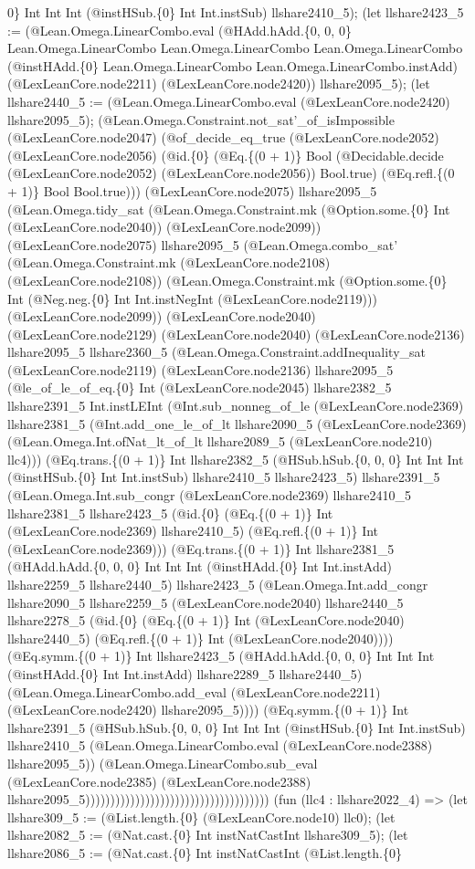\documentclass[11pt]{article}
\begin{document}
0\} Int Int Int (@instHSub.\{0\} Int Int.instSub) llshare2410\_5); (let llshare2423\_5 := (@Lean.Omega.LinearCombo.eval (@HAdd.hAdd.\{0, 0, 0\} Lean.Omega.LinearCombo Lean.Omega.LinearCombo Lean.Omega.LinearCombo (@instHAdd.\{0\} Lean.Omega.LinearCombo Lean.Omega.LinearCombo.instAdd) (@LexLeanCore.node2211) (@LexLeanCore.node2420)) llshare2095\_5); (let llshare2440\_5 := (@Lean.Omega.LinearCombo.eval (@LexLeanCore.node2420) llshare2095\_5); (@Lean.Omega.Constraint.not\_sat'\_of\_isImpossible (@LexLeanCore.node2047) (@of\_decide\_eq\_true (@LexLeanCore.node2052) (@LexLeanCore.node2056) (@id.\{0\} (@Eq.\{(0 + 1)\} Bool (@Decidable.decide (@LexLeanCore.node2052) (@LexLeanCore.node2056)) Bool.true) (@Eq.refl.\{(0 + 1)\} Bool Bool.true))) (@LexLeanCore.node2075) llshare2095\_5 (@Lean.Omega.tidy\_sat (@Lean.Omega.Constraint.mk (@Option.some.\{0\} Int (@LexLeanCore.node2040)) (@LexLeanCore.node2099)) (@LexLeanCore.node2075) llshare2095\_5 (@Lean.Omega.combo\_sat' (@Lean.Omega.Constraint.mk (@LexLeanCore.node2108) (@LexLeanCore.node2108)) (@Lean.Omega.Constraint.mk (@Option.some.\{0\} Int (@Neg.neg.\{0\} Int Int.instNegInt (@LexLeanCore.node2119))) (@LexLeanCore.node2099)) (@LexLeanCore.node2040) (@LexLeanCore.node2129) (@LexLeanCore.node2040) (@LexLeanCore.node2136) llshare2095\_5 llshare2360\_5 (@Lean.Omega.Constraint.addInequality\_sat (@LexLeanCore.node2119) (@LexLeanCore.node2136) llshare2095\_5 (@le\_of\_le\_of\_eq.\{0\} Int (@LexLeanCore.node2045) llshare2382\_5 llshare2391\_5 Int.instLEInt (@Int.sub\_nonneg\_of\_le (@LexLeanCore.node2369) llshare2381\_5 (@Int.add\_one\_le\_of\_lt llshare2090\_5 (@LexLeanCore.node2369) (@Lean.Omega.Int.ofNat\_lt\_of\_lt llshare2089\_5 (@LexLeanCore.node210) llc4))) (@Eq.trans.\{(0 + 1)\} Int llshare2382\_5 (@HSub.hSub.\{0, 0, 0\} Int Int Int (@instHSub.\{0\} Int Int.instSub) llshare2410\_5 llshare2423\_5) llshare2391\_5 (@Lean.Omega.Int.sub\_congr (@LexLeanCore.node2369) llshare2410\_5 llshare2381\_5 llshare2423\_5 (@id.\{0\} (@Eq.\{(0 + 1)\} Int (@LexLeanCore.node2369) llshare2410\_5) (@Eq.refl.\{(0 + 1)\} Int (@LexLeanCore.node2369))) (@Eq.trans.\{(0 + 1)\} Int llshare2381\_5 (@HAdd.hAdd.\{0, 0, 0\} Int Int Int (@instHAdd.\{0\} Int Int.instAdd) llshare2259\_5 llshare2440\_5) llshare2423\_5 (@Lean.Omega.Int.add\_congr llshare2090\_5 llshare2259\_5 (@LexLeanCore.node2040) llshare2440\_5 llshare2278\_5 (@id.\{0\} (@Eq.\{(0 + 1)\} Int (@LexLeanCore.node2040) llshare2440\_5) (@Eq.refl.\{(0 + 1)\} Int (@LexLeanCore.node2040)))) (@Eq.symm.\{(0 + 1)\} Int llshare2423\_5 (@HAdd.hAdd.\{0, 0, 0\} Int Int Int (@instHAdd.\{0\} Int Int.instAdd) llshare2289\_5 llshare2440\_5) (@Lean.Omega.LinearCombo.add\_eval (@LexLeanCore.node2211) (@LexLeanCore.node2420) llshare2095\_5)))) (@Eq.symm.\{(0 + 1)\} Int llshare2391\_5 (@HSub.hSub.\{0, 0, 0\} Int Int Int (@instHSub.\{0\} Int Int.instSub) llshare2410\_5 (@Lean.Omega.LinearCombo.eval (@LexLeanCore.node2388) llshare2095\_5)) (@Lean.Omega.LinearCombo.sub\_eval (@LexLeanCore.node2385) (@LexLeanCore.node2388) llshare2095\_5))))))))))))))))))))))))))))))))))))) (fun (llc4 : llshare2022\_4) => (let llshare309\_5 := (@List.length.\{0\} (@LexLeanCore.node10) llc0); (let llshare2082\_5 := (@Nat.cast.\{0\} Int instNatCastInt llshare309\_5); (let llshare2086\_5 := (@Nat.cast.\{0\} Int instNatCastInt (@List.length.\{0\} 
\end{document}
